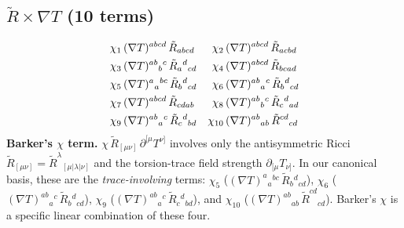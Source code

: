 \documentclass[12pt,a4paper]{article}
\newcommand{\Rt}{\tilde{R}}         %
\newcommand{\del}{\nabla}            %
\newcommand{\pd}{\partial}           %
\begin{document}
\subsection{$\Rt \times \del T$ (10 terms)}
\begin{align}
  \chi_1&\, (\del T)^{abcd}\, \Rt_{abcd}  &
  \chi_2&\, (\del T)^{abcd}\, \Rt_{acbd}  \notag\\
  \chi_3&\, (\del T)^{ab}{}_{b}{}^{c}\, \Rt_{a}{}^{d}{}_{cd}  &
  \chi_4&\, (\del T)^{abcd}\, \Rt_{bcad}  \notag\\
  \chi_5&\, (\del T)^{a}{}_{a}{}^{bc}\, \Rt_{b}{}^{d}{}_{cd}  &
  \chi_6&\, (\del T)^{ab}{}_{a}{}^{c}\, \Rt_{b}{}^{d}{}_{cd}  \notag\\
  \chi_7&\, (\del T)^{abcd}\, \Rt_{cdab}  &
  \chi_8&\, (\del T)^{ab}{}_{b}{}^{c}\, \Rt_{c}{}^{d}{}_{ad}  \notag\\
  \chi_9&\, (\del T)^{ab}{}_{a}{}^{c}\, \Rt_{c}{}^{d}{}_{bd}  &
  \chi_{10}&\, (\del T)^{ab}{}_{ab}\, \Rt^{cd}{}_{cd}
  \label{eq:r_dt_explicit}
\end{align}
\noindent\textbf{Barker's $\chi$ term.}
$\chi\, \Rt_{[\mu\nu]}\, \pd^{[\mu} T^{\nu]}$
involves only the antisymmetric Ricci
$\Rt_{[\mu\nu]} = \Rt^\lambda{}_{[\mu|\lambda|\nu]}$ and the
torsion-trace field strength $\pd_{[\mu} T_{\nu]}$.
In our canonical basis, these are the \emph{trace-involving} terms:
$\chi_5$ ($(\del T)^a{}_{a}{}^{bc}\, \Rt_{b}{}^d{}_{cd}$),
$\chi_6$ ($(\del T)^{ab}{}_{a}{}^{c}\, \Rt_{b}{}^d{}_{cd}$),
$\chi_9$ ($(\del T)^{ab}{}_{a}{}^{c}\, \Rt_{c}{}^d{}_{bd}$), and
$\chi_{10}$ ($(\del T)^{ab}{}_{ab}\, \Rt^{cd}{}_{cd}$).
Barker's $\chi$ is a specific linear combination of these four.
\end{document}
